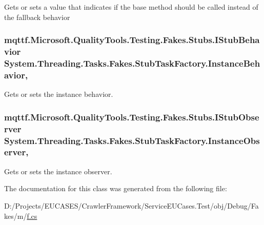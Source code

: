Gets or sets a value that indicates if the base method should be called instead of the fallback behavior

\hypertarget{class_system_1_1_threading_1_1_tasks_1_1_fakes_1_1_stub_task_factory_a1e35e33fdd46e20be035d9a55cddb5b3}{
\subsubsection[{Instance\-Behavior}]{\setlength{\rightskip}{0pt plus 5cm}mqttf.\-Microsoft.\-Quality\-Tools.\-Testing.\-Fakes.\-Stubs.\-I\-Stub\-Behavior System.\-Threading.\-Tasks.\-Fakes.\-Stub\-Task\-Factory.\-Instance\-Behavior\hspace{0.3cm}{\ttfamily [get]}, {\ttfamily [set]}}}\label{class_system_1_1_threading_1_1_tasks_1_1_fakes_1_1_stub_task_factory_a1e35e33fdd46e20be035d9a55cddb5b3}


Gets or sets the instance behavior.

\hypertarget{class_system_1_1_threading_1_1_tasks_1_1_fakes_1_1_stub_task_factory_ae2efadf1cc2ca8ee05b1f834e9100c2b}{
\subsubsection[{Instance\-Observer}]{\setlength{\rightskip}{0pt plus 5cm}mqttf.\-Microsoft.\-Quality\-Tools.\-Testing.\-Fakes.\-Stubs.\-I\-Stub\-Observer System.\-Threading.\-Tasks.\-Fakes.\-Stub\-Task\-Factory.\-Instance\-Observer\hspace{0.3cm}{\ttfamily [get]}, {\ttfamily [set]}}}\label{class_system_1_1_threading_1_1_tasks_1_1_fakes_1_1_stub_task_factory_ae2efadf1cc2ca8ee05b1f834e9100c2b}


Gets or sets the instance observer.



The documentation for this class was generated from the following file\-:\begin{DoxyCompactItemize}
\item 
D\-:/\-Projects/\-E\-U\-C\-A\-S\-E\-S/\-Crawler\-Framework/\-Service\-E\-U\-Cases.\-Test/obj/\-Debug/\-Fakes/m/\hyperlink{m_2f_8cs}{f.\-cs}\end{DoxyCompactItemize}
